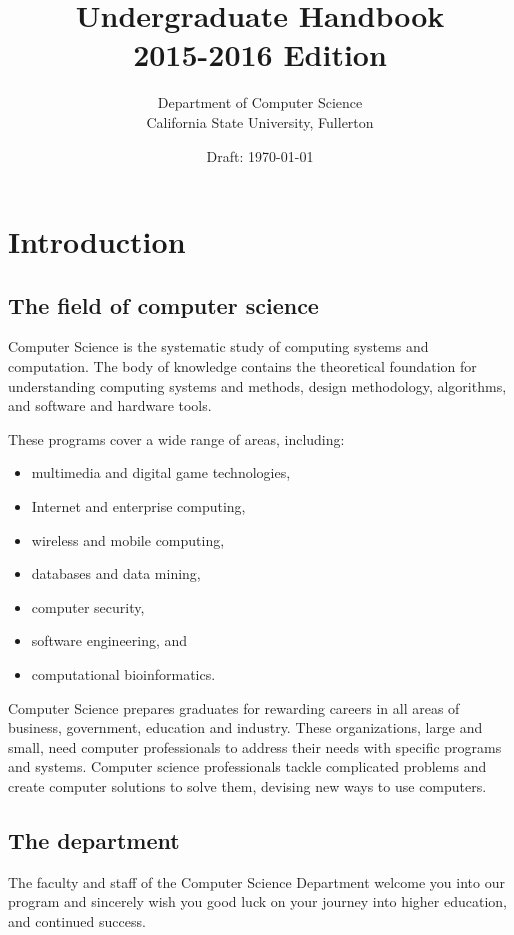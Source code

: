 \documentclass{book}
\begin{document}
\title{Undergraduate Handbook \\ 2015-2016 Edition}
\author{Department of Computer Science \\ California State University, Fullerton}
\date{Draft: \today}
\maketitle

\newpage
\tableofcontents

\chapter{Introduction}

\section{The field of computer science}
Computer Science is the systematic study of computing systems and computation. The body of knowledge contains the theoretical foundation for understanding computing systems and methods, design methodology, algorithms, and software and hardware tools.

These programs cover a wide range of areas, including:
\begin{itemize}
\item multimedia and digital game technologies,
\item Internet and enterprise computing,
\item wireless and mobile computing,
\item databases and data mining,
\item computer security,
\item software engineering, and
\item computational bioinformatics.
\end{itemize}

Computer Science prepares graduates for rewarding careers in all areas of business, government, education and industry. These organizations, large and small, need computer professionals to address their needs with specific programs and systems. Computer science professionals tackle complicated problems and create computer solutions to solve them, devising new ways to use computers.

\section{The department}
The faculty and staff of the Computer Science Department welcome you into our program and sincerely wish you good luck on your journey into higher education, and continued success.
\end{document}
